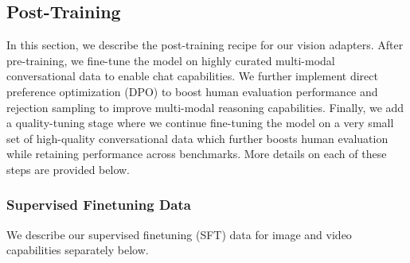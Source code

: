 \subsection{Post-Training}
\label{section:vision_post_training}
In this section, we describe the post-training recipe for our vision adapters. After pre-training, we fine-tune the model on highly curated multi-modal conversational data to enable chat capabilities. We further implement direct preference optimization (DPO) to boost human evaluation performance and rejection sampling to improve multi-modal reasoning capabilities. Finally, we add a quality-tuning stage where we continue fine-tuning the model on a very small set of high-quality conversational data which further boosts human evaluation while retaining performance across benchmarks. More details on each of these steps are provided below.

\subsubsection{Supervised Finetuning Data}
\label{subsubsection:vision_supervised_finetuning_data}
We describe our supervised finetuning (SFT) data for image and video capabilities separately below.

